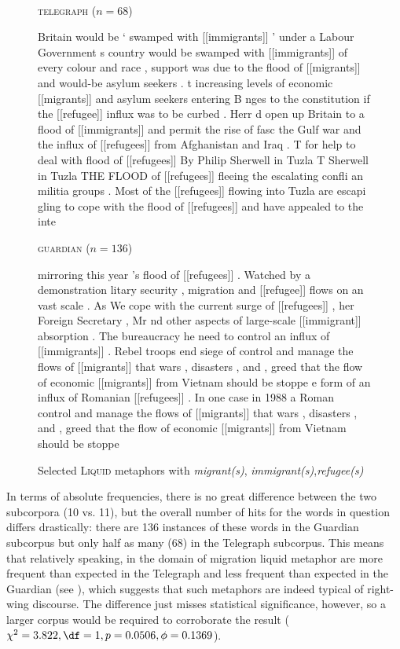 \begin{figure}
\caption{Selected \textsc{Liquid} metaphors with \textit{migrant(s)}, \textit{immigrant(s)},\textit{refugee(s)}}
\label{fig:liquidrefugee}
\hrulefill \\
\textsc{telegraph} ($n=68$)
\begin{fitverb}
Britain would be ` swamped with [[immigrants]] ' under a Labour Government
s country would be swamped with [[immigrants]] of every colour and race ,
support was due to the flood of [[migrants]] and would-be asylum seekers .
t increasing levels of economic [[migrants]] and asylum seekers entering B
nges to the constitution if the [[refugee]] influx was to be curbed . Herr
d open up Britain to a flood of [[immigrants]] and permit the rise of fasc
 the Gulf war and the influx of [[refugees]] from Afghanistan and Iraq . T
 for help to deal with flood of [[refugees]] By Philip Sherwell in Tuzla T
 Sherwell in Tuzla THE FLOOD of [[refugees]] fleeing the escalating confli
an militia groups . Most of the [[refugees]] flowing into Tuzla are escapi
gling to cope with the flood of [[refugees]] and have appealed to the inte
\end{fitverb}
\textsc{guardian} ($n=136$)
\begin{fitverb}
mirroring this year 's flood of [[refugees]] . Watched by a demonstration
litary security , migration and [[refugee]] flows on an vast scale . As We
 cope with the current surge of [[refugees]] , her Foreign Secretary , Mr
nd other aspects of large-scale [[immigrant]] absorption . The bureaucracy
he need to control an influx of [[immigrants]] . Rebel troops end siege of
control and manage the flows of [[migrants]] that wars , disasters , and ,
greed that the flow of economic [[migrants]] from Vietnam should be stoppe
e form of an influx of Romanian [[refugees]] . In one case in 1988 a Roman
control and manage the flows of [[migrants]] that wars , disasters , and ,
greed that the flow of economic [[migrants]] from Vietnam should be stoppe
\end{fitverb}
\hrulefill
\end{figure}

In terms of absolute frequencies,  there is no great difference between the two subcorpora (10 vs. 11), but the overall number of hits for the words in question differs drastically: there are 136 instances of these words in the Guardian subcorpus but only half as many (68) in the Telegraph subcorpus. This means that relatively speaking, in the domain of migration liquid metaphor  are more frequent than expected  in the Telegraph and less frequent than expected in the Guardian (see ), which suggests that such metaphors are indeed typical of right\hyp{}wing discourse. The difference just misses statistical significance, however, so a larger  corpus would be required to corroborate the result ($\chi^2 = 3.822, \df = 1, p = 0.0506, \phi = 0.1369$).

